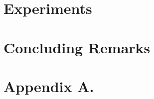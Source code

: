\documentclass{article} %
\begin{document}
\section{Experiments}
\label{sec:experiments}




\section{Concluding Remarks}
\label{sec:conclusions}




\newpage

\appendix
\section*{Appendix A.}




\end{document}
